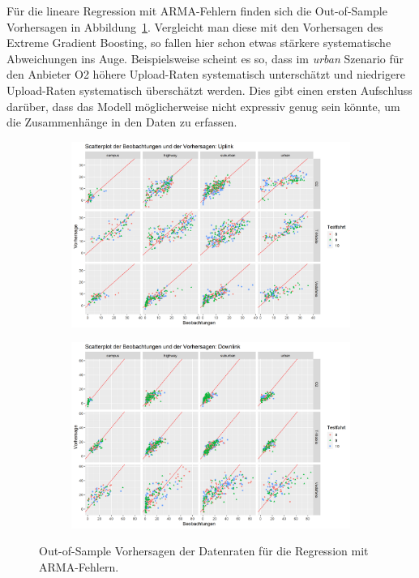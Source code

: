 F\"ur die lineare Regression mit ARMA-Fehlern finden sich die Out-of-Sample Vorhersagen in Abbildung~\ref{fig:datarate-predictions-arma}.
Vergleicht man diese mit den Vorhersagen des Extreme Gradient Boosting, so fallen hier schon etwas st\"arkere systematische
Abweichungen ins Auge.
Beispielsweise scheint es so, dass im \textit{urban} Szenario f\"ur den Anbieter O2 h\"ohere Upload-Raten systematisch untersch\"atzt
und niedrigere Upload-Raten systematisch \"ubersch\"atzt werden.
Dies gibt einen ersten Aufschluss dar\"uber, dass das Modell m\"oglicherweise nicht expressiv genug sein k\"onnte,
um die Zusammenh\"ange in den Daten zu erfassen.
\begin{figure}
\centering
\begin{subfigure}{\textwidth}
    \centering
    \includegraphics[width=\textwidth]{abbildungen/arma_predictions_ul}
\end{subfigure}
\begin{subfigure}{\textwidth}
    \centering
    \includegraphics[width=\textwidth]{abbildungen/arma_predictions_dl}
\end{subfigure}
\caption{Out-of-Sample Vorhersagen der Datenraten f\"ur die Regression mit ARMA-Fehlern.}
\label{fig:datarate-predictions-arma}
\end{figure}

